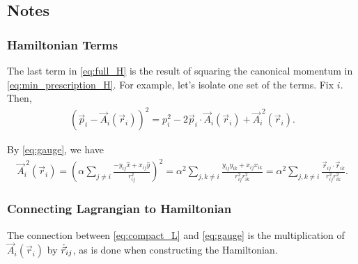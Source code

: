 \subsection{Notes}
\subsubsection{Hamiltonian Terms}
The last term in \cref{eq:full_H} is the result of squaring the canonical momentum in \cref{eq:min_prescription_H}. For example, let's isolate one set of the terms. Fix $i$. Then,
\begin{align*}
    {(\vec{p}_i - \vec{A}_i(\vec{r}_i))}^2 = {p}_i^{2} - 2\vec{p}_i\cdot\vec{A}_i(\vec{r}_i) + \vec{A}_i^{\;2}(\vec{r}_i).
\end{align*}

By \cref{eq:gauge}, we have
\begin{align*}
    \vec{A}_i^{\;2}(\vec{r}_i) = {\left( \alpha\sum_{j\neq i}\frac{-y_{ij}\hat{x} + x_{ij}\hat{y}}{r_{ij}^2} \right)}^2 = \alpha^2\sum_{j,k\neq i}\frac{y_{ij}y_{ik} + x_{ij}x_{ik}}{r_{ij}^2r_{ik}^2} = \alpha^2\sum_{j,k\neq i}\frac{\vec{r}_{ij}\cdot\vec{r}_{ik}}{r_{ij}^2r_{ik}^2}.
\end{align*}

\subsubsection{Connecting Lagrangian to Hamiltonian}
The connection between \cref{eq:compact_L} and \cref{eq:gauge} is the multiplication of $\vec{A}_i(\vec{r}_i)$ by $\dot{\vec{r}}_{ij}$, as is done when constructing the Hamiltonian.